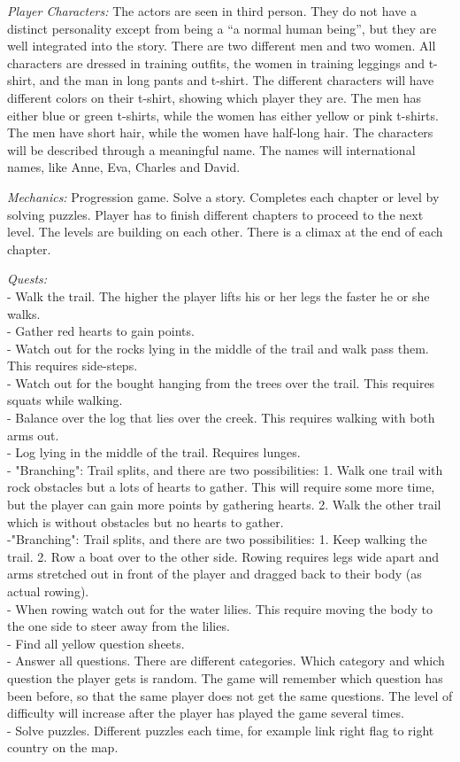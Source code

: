 \emph{Player Characters:} The actors are seen in third person. They do not have a distinct personality except from being a “a normal human being”, but they are well integrated into the story. There are two different men and two women. All characters are dressed in training outfits, the women in training leggings and t-shirt, and the man in long pants and t-shirt. The different characters will have different colors on their t-shirt, showing which player they are. The men has either blue or green t-shirts, while the women has either yellow or pink t-shirts. The men have short hair, while the women have half-long hair. The characters will be described through a meaningful name. The names will international names, like Anne, Eva, Charles and David. 

\emph{Mechanics:} Progression game. Solve a story. Completes each chapter or level by solving puzzles. Player has to finish different chapters to proceed to the next level. The levels are building on each other. There is a climax at the end of each chapter. 

\emph{Quests:} \\
- Walk the trail. The higher the player lifts his or her legs the faster he or she walks.\\
- Gather red hearts to gain points. \\
- Watch out for the rocks lying in the middle of the trail and walk pass them. This requires side-steps. \\
- Watch out for the bought hanging from the trees over the trail. This requires squats while walking.\\
- Balance over the log that lies over the creek. This requires walking with both arms out. \\
- Log lying in the middle of the trail. Requires lunges. \\
- "Branching": Trail splits, and there are two possibilities: 1. Walk one trail with rock obstacles but a lots of hearts to gather. This will require some more time, but the player can gain more points by gathering hearts. 2. Walk the other trail which is without obstacles but no hearts to gather. \\
-"Branching": Trail splits, and there are two possibilities: 1. Keep walking the trail. 2. Row a boat over to the other side. Rowing requires legs wide apart and arms stretched out in front of the player and dragged back to their body (as actual rowing). \\
- When rowing watch out for the water lilies. This require moving the body to the one side to steer away from the lilies. \\
- Find all yellow question sheets. \\
- Answer all questions. There are different categories. Which category and which question the player gets is random. The game will remember which question has been before, so that the same player does not get the same questions. The level of difficulty will increase after the player has played the game several times. \\
- Solve puzzles. Different puzzles each time, for example link right flag to right country on the map.\\

